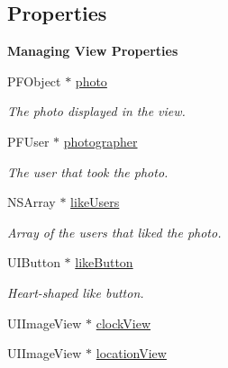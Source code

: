 \subsection*{Properties}
\begin{Indent}{\bf Managing View Properties}\par
\begin{DoxyCompactItemize}
\item 
\hypertarget{interface_e_s_photo_details_header_view_ac2c16b6117aa73ec796ee6592b5c8f03}{}P\+F\+Object $\ast$ \hyperlink{interface_e_s_photo_details_header_view_ac2c16b6117aa73ec796ee6592b5c8f03}{photo}\label{interface_e_s_photo_details_header_view_ac2c16b6117aa73ec796ee6592b5c8f03}

\begin{DoxyCompactList}\small\item\em The photo displayed in the view. \end{DoxyCompactList}\item 
\hypertarget{interface_e_s_photo_details_header_view_a44e8b296334ece30dc2999ad711cf634}{}P\+F\+User $\ast$ \hyperlink{interface_e_s_photo_details_header_view_a44e8b296334ece30dc2999ad711cf634}{photographer}\label{interface_e_s_photo_details_header_view_a44e8b296334ece30dc2999ad711cf634}

\begin{DoxyCompactList}\small\item\em The user that took the photo. \end{DoxyCompactList}\item 
\hypertarget{interface_e_s_photo_details_header_view_a1bb59690f307441b4e6bab79d3cf9eb2}{}N\+S\+Array $\ast$ \hyperlink{interface_e_s_photo_details_header_view_a1bb59690f307441b4e6bab79d3cf9eb2}{like\+Users}\label{interface_e_s_photo_details_header_view_a1bb59690f307441b4e6bab79d3cf9eb2}

\begin{DoxyCompactList}\small\item\em Array of the users that liked the photo. \end{DoxyCompactList}\item 
\hypertarget{interface_e_s_photo_details_header_view_a2ca2466963c5211d166fd04f02af8376}{}U\+I\+Button $\ast$ \hyperlink{interface_e_s_photo_details_header_view_a2ca2466963c5211d166fd04f02af8376}{like\+Button}\label{interface_e_s_photo_details_header_view_a2ca2466963c5211d166fd04f02af8376}

\begin{DoxyCompactList}\small\item\em Heart-\/shaped like button. \end{DoxyCompactList}\item 
U\+I\+Image\+View $\ast$ \hyperlink{interface_e_s_photo_details_header_view_abe93992a8f7c71454b8fce256b5b891e}{clock\+View}
\item 
U\+I\+Image\+View $\ast$ \hyperlink{interface_e_s_photo_details_header_view_af478dcf2fa013a647a29a506c48d01e1}{location\+View}
\end{DoxyCompactItemize}
\end{Indent}
